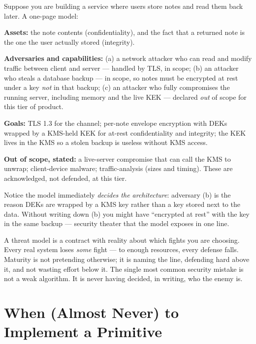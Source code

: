\begin{example}
\label{ch39:threatmodel-ex}
Suppose you are building a service where users store notes and read them back later.
A one-page model:

\textbf{Assets:} the note contents (confidentiality), and the fact that a returned
note is the one the user actually stored (integrity).

\textbf{Adversaries and capabilities:} (a) a network attacker who can read and
modify traffic between client and server --- handled by TLS, in scope; (b) an
attacker who steals a database backup --- in scope, so notes must be encrypted at
rest under a key \emph{not} in that backup; (c) an attacker who fully compromises
the running server, including memory and the live KEK --- declared \emph{out} of
scope for this tier of product.

\textbf{Goals:} TLS 1.3 for the channel; per-note envelope encryption with DEKs
wrapped by a KMS-held KEK for at-rest confidentiality and integrity; the KEK lives
in the KMS so a stolen backup is useless without KMS access.

\textbf{Out of scope, stated:} a live-server compromise that can call the KMS to
unwrap; client-device malware; traffic-analysis (sizes and timing). These are
acknowledged, not defended, at this tier.

Notice the model immediately \emph{decides the architecture}: adversary (b) is the
reason DEKs are wrapped by a KMS key rather than a key stored next to the data.
Without writing down (b) you might have ``encrypted at rest'' with the key in the
same backup --- security theater that the model exposes in one line.
\end{example}

\begin{intuitionbox}
A threat model is a contract with reality about which fights you are choosing.
Every real system loses \emph{some} fight --- to enough resources, every defense
falls. Maturity is not pretending otherwise; it is naming the line, defending
hard above it, and not wasting effort below it. The single most common security
mistake is not a weak algorithm. It is never having decided, in writing, who the
enemy is.
\end{intuitionbox}

\section{When (Almost Never) to Implement a Primitive}
\label{ch39:when-roll}

